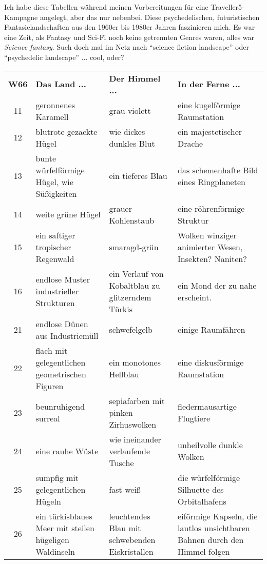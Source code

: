 Ich habe diese Tabellen während meinen Vorbereitungen für eine
Traveller5-Kampagne angelegt, aber das nur nebenbei. Diese
psychedelischen, futuristischen Fantasielandschaften aus den 1960er
bis 1980er Jahren faszinieren mich. Es war eine Zeit, als Fantasy 
und Sci-Fi noch keine getrennten Genres waren, alles war \textit{Science fantasy}.
Such doch mal im Netz nach ``science fiction landscape'' oder
``psychedelic landscape'' ... cool, oder?

\begin{tabularx}{\columnwidth}{cZZZ}
\textbf{W66} & \textbf{Das Land ...} & \textbf{Der Himmel ...} &
\textbf{In der Ferne ...} \\
11 & geronnenes Karamell & grau-violett & eine kugelförmige Raumstation \\
12 & blutrote gezackte Hügel & wie dickes dunkles Blut & ein
majestetischer Drache \\
13 & bunte würfelförmige Hügel, wie Süßigkeiten & ein tieferes Blau
& das schemenhafte Bild eines Ringplaneten \\
14 & weite grüne Hügel & grauer Kohlenstaub & eine röhrenförmige
Struktur \\
15 & ein saftiger tropischer Regenwald & smaragd-grün & Wolken
winziger animierter Wesen, Insekten? Naniten? \\
16 & endlose Muster industrieller Strukturen & ein Verlauf von
Kobaltblau zu glitzerndem Türkis & ein Mond der zu nahe erscheint.
\\
21 & endlose Dünen aus Industriemüll & schwefelgelb & einige
Raumfähren \\
22 & flach mit gelegentlichen geometrischen Figuren & ein monotones
Hellblau & eine diskusförmige Raumstation \\
23 & beunruhigend surreal & sepiafarben mit pinken Zirhuswolken &
fledermausartige Flugtiere \\
24 & eine rauhe Wüste & wie ineinander verlaufende Tusche &
unheilvolle dunkle Wolken \\
25 & sumpfig mit gelegentlichen Hügeln & fast weiß & die
würfelförmige Silhuette des Orbitalhafens \\
26 & ein türkisblaues Meer mit steilen hügeligen Waldinseln &
leuchtendes Blau mit schwebenden Eiskristallen & eiförmige Kapseln,
die lautlos unsichtbaren Bahnen durch den Himmel folgen \\
\end{tabularx}


